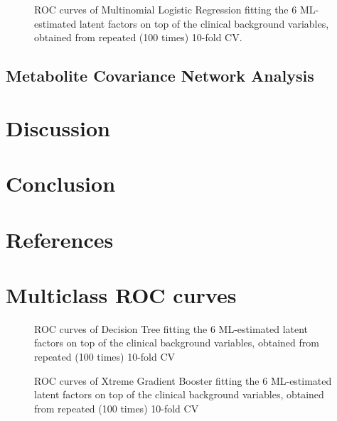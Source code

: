 \documentclass{amsart}
\begin{document}
\begin{figure}
  
  \caption{ROC curves of Multinomial Logistic Regression fitting the 6 ML-estimated latent factors on top of the clinical background variables, obtained from repeated (100 times) 10-fold CV.}
  \label{roc:6mlogit}
\end{figure}
\clearpage
\subsection{Metabolite Covariance Network Analysis}

\clearpage
\section{Discussion} \label{discuss}

\clearpage
\section{Conclusion} \label{concl}






\newpage
\section*{References}
\printbibliography[heading=none]
\clearpage
\appendix 
\clearpage
\section{Multiclass ROC curves}
\begin{figure}[htb]
  
  \caption{ROC curves of Decision Tree fitting the 6 ML-estimated latent factors on top of the clinical background variables, obtained from repeated (100 times) 10-fold CV}
  \label{roc:tree}
  
  \caption{ROC curves of Xtreme Gradient Booster fitting the 6 ML-estimated latent factors on top of the clinical background variables, obtained from repeated (100 times) 10-fold CV}
  \label{roc:xgb}
  \end{figure}
\end{document}
